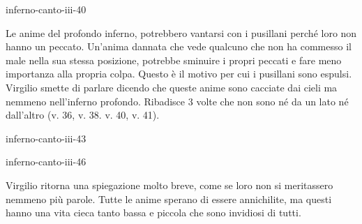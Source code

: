 \documentclass[preview]{standalone}
\begin{document}
\begin{snippet}{inferno-canto-iii-40}
    
    Le anime del profondo inferno, potrebbero vantarsi con i pusillani perché loro non hanno un peccato.
    Un'anima dannata che vede qualcuno che non ha commesso il male nella sua stessa posizione,
    potrebbe sminuire i propri peccati e fare meno importanza alla propria colpa.
    Questo è il motivo per cui i pusillani sono espulsi.
    \\
    Virgilio smette di parlare dicendo che queste anime sono cacciate dai cieli
    ma nemmeno nell'inferno profondo. Ribadisce 3 volte che non sono né da un lato né dall'altro
    (v. 36, v. 38. v. 40, v. 41).
\end{snippet}

\begin{snippet}{inferno-canto-iii-43}
\end{snippet}

\begin{snippet}{inferno-canto-iii-46}
    


    Virgilio ritorna una spiegazione molto breve, come se loro non si meritassero nemmeno
    più parole. Tutte le anime sperano di essere annichilite, ma questi
    hanno una vita cieca tanto bassa e piccola che sono invidiosi di tutti.
\end{snippet}
\end{document}
